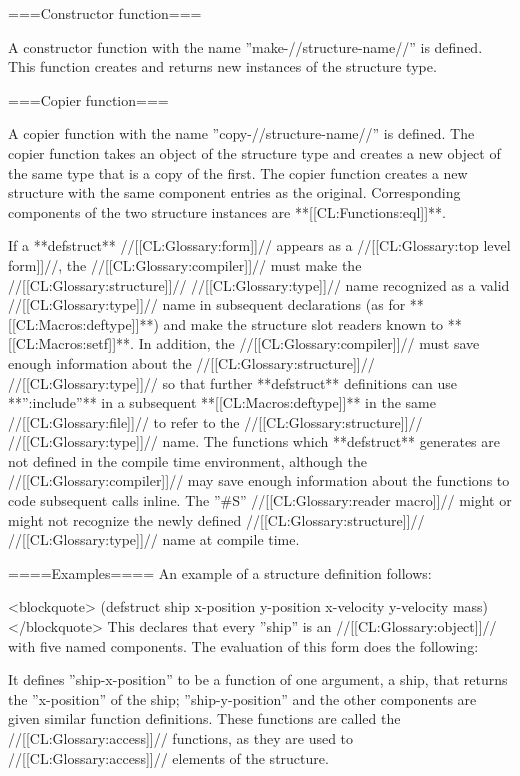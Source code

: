 ===Constructor function===

A constructor function with the name ''make-//structure-name//'' is defined. This function creates and returns new instances of the structure type.

===Copier function===

A copier function with the name ''copy-//structure-name//'' is defined. The copier function takes an object of the structure type and creates a new object of the same type that is a copy of the first. The copier function creates a new structure with the same component entries as the original. Corresponding components of the two structure instances are **[[CL:Functions:eql]]**. \endlist

If a **defstruct** //[[CL:Glossary:form]]// appears as a //[[CL:Glossary:top level form]]//, the //[[CL:Glossary:compiler]]// must make the //[[CL:Glossary:structure]]// //[[CL:Glossary:type]]// name recognized as a valid //[[CL:Glossary:type]]// name in subsequent declarations (as for **[[CL:Macros:deftype]]**) and make the structure slot readers known to **[[CL:Macros:setf]]**. In addition, the //[[CL:Glossary:compiler]]// must save enough information about the //[[CL:Glossary:structure]]// //[[CL:Glossary:type]]// so that further **defstruct** definitions can use **'':include''** in a subsequent **[[CL:Macros:deftype]]** in the same //[[CL:Glossary:file]]// to refer to the //[[CL:Glossary:structure]]// //[[CL:Glossary:type]]// name. The functions which **defstruct** generates are not defined in the compile time environment, although the //[[CL:Glossary:compiler]]// may save enough information about the functions to code subsequent calls inline. The ''#S'' //[[CL:Glossary:reader macro]]// might or might not recognize the newly defined //[[CL:Glossary:structure]]// //[[CL:Glossary:type]]// name at compile time.

====Examples====
An example of a structure definition follows:

<blockquote> (defstruct ship x-position y-position x-velocity y-velocity mass) </blockquote> This declares that every ''ship'' is an //[[CL:Glossary:object]]// with five named components. The evaluation of this form does the following:

\beginlist {} It defines ''ship-x-position'' to be a function of one argument, a ship, that returns the ''x-position'' of the ship; ''ship-y-position'' and the other components are given similar function definitions. These functions are called the //[[CL:Glossary:access]]// functions, as they are used to //[[CL:Glossary:access]]// elements of the structure.


